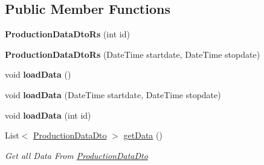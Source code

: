 \subsection*{Public Member Functions}
\begin{DoxyCompactItemize}
\item 
\mbox{\label{classkpi_mvc_api_1_1_data_transfer_objects_1_1_production_data_dto_rs_af322603913a41645237ffe3d7060cf51}} 
{\bfseries Production\+Data\+Dto\+Rs} (int id)
\item 
\mbox{\label{classkpi_mvc_api_1_1_data_transfer_objects_1_1_production_data_dto_rs_a1694f3f486bf07ce79efd887f9086d63}} 
{\bfseries Production\+Data\+Dto\+Rs} (Date\+Time startdate, Date\+Time stopdate)
\item 
\mbox{\label{classkpi_mvc_api_1_1_data_transfer_objects_1_1_production_data_dto_rs_a58fd92fa5a7191f03f2e0942afaaa65d}} 
void {\bfseries load\+Data} ()
\item 
\mbox{\label{classkpi_mvc_api_1_1_data_transfer_objects_1_1_production_data_dto_rs_a375b888daefaacc620cffef48ac7ab81}} 
void {\bfseries load\+Data} (Date\+Time startdate, Date\+Time stopdate)
\item 
\mbox{\label{classkpi_mvc_api_1_1_data_transfer_objects_1_1_production_data_dto_rs_a7d16375d7b096dca36d98942a6e0f80f}} 
void {\bfseries load\+Data} (int id)
\item 
List$<$ \hyperlink{classkpi_mvc_api_1_1_data_transfer_objects_1_1_production_data_dto}{Production\+Data\+Dto} $>$ \hyperlink{classkpi_mvc_api_1_1_data_transfer_objects_1_1_production_data_dto_rs_abd52b81c37bd026514f480e3d6dd952b}{get\+Data} ()
\begin{DoxyCompactList}\small\item\em Get all Data From \hyperlink{classkpi_mvc_api_1_1_data_transfer_objects_1_1_production_data_dto}{Production\+Data\+Dto} \end{DoxyCompactList}\item 
\mbox{\label{classkpi_mvc_api_1_1_data_transfer_objects_1_1_production_data_dto_rs_a403a889d4d7b6dbc5ddd07e85c660892}} 

\end{DoxyCompactItemize}
